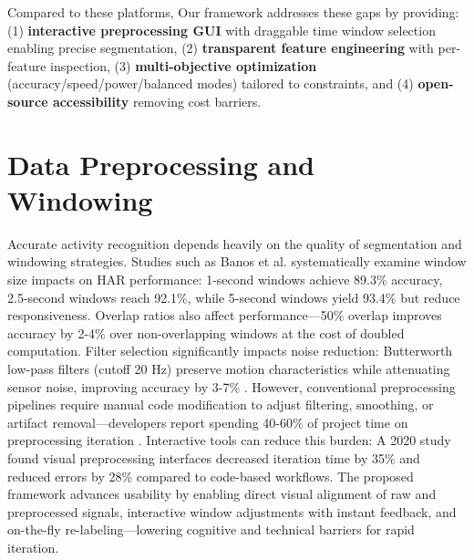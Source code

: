 Compared to these platforms, Our framework addresses these gaps by providing: (1) \textbf{interactive preprocessing GUI} with draggable time window selection enabling precise segmentation, (2) \textbf{transparent feature engineering} with per-feature inspection, (3) \textbf{multi-objective optimization} (accuracy/speed/power/balanced modes) tailored to constraints, and (4) \textbf{open-source accessibility} removing cost barriers.

\section{Data Preprocessing and Windowing}
Accurate activity recognition depends heavily on the quality of segmentation and windowing strategies. Studies such as Banos et al. \cite{banos2014wisdm} systematically examine window size impacts on HAR performance: 1-second windows achieve 89.3\% accuracy, 2.5-second windows reach 92.1\%, while 5-second windows yield 93.4\% but reduce responsiveness. Overlap ratios also affect performance---50\% overlap improves accuracy by 2-4\% over non-overlapping windows \cite{wan2021deep_har_review} at the cost of doubled computation. Filter selection significantly impacts noise reduction: Butterworth low-pass filters (cutoff 20 Hz) preserve motion characteristics while attenuating sensor noise, improving accuracy by 3-7\% \cite{filippeschi2017survey_imu}. However, conventional preprocessing pipelines require manual code modification to adjust filtering, smoothing, or artifact removal---developers report spending 40-60\% of project time on preprocessing iteration \cite{merenda2020edge}. Interactive tools can reduce this burden: A 2020 study \cite{amershi2014power} found visual preprocessing interfaces decreased iteration time by 35\% and reduced errors by 28\% compared to code-based workflows. The proposed framework advances usability by enabling direct visual alignment of raw and preprocessed signals, interactive window adjustments with instant feedback, and on-the-fly re-labeling---lowering cognitive and technical barriers for rapid iteration.

